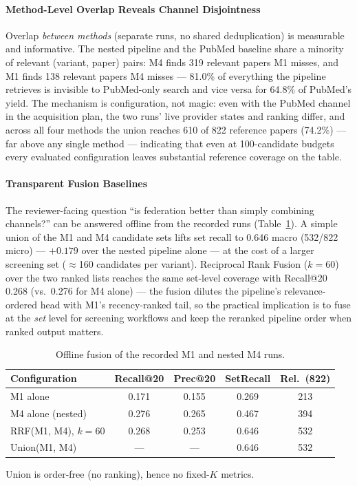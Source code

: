 \documentclass[sigconf,screen]{acmart}
\begin{document}
\paragraph{Method-Level Overlap Reveals Channel Disjointness}
Overlap \emph{between methods} (separate runs, no shared deduplication) is
measurable and informative. The nested pipeline and the PubMed baseline
share a minority of relevant (variant, paper) pairs: M4 finds 319 relevant
papers M1 misses, and M1 finds 138 relevant papers M4 misses --- 81.0\% of
everything the pipeline retrieves is invisible to PubMed-only search and
vice versa for 64.8\% of PubMed's yield. The mechanism is configuration,
not magic: even with the PubMed channel in the acquisition plan, the two
runs' live provider states and ranking differ, and across all four methods
the union reaches 610 of 822 reference papers (74.2\%) --- far above any
single method --- indicating that even at 100-candidate budgets every
evaluated configuration leaves substantial reference coverage on the
table.

\paragraph{Transparent Fusion Baselines}
The reviewer-facing question ``is federation better than simply combining
channels?'' can be answered offline from the recorded runs
(Table~\ref{tab:fusion}). A simple union of the M1 and M4 candidate sets
lifts set recall to 0.646 macro (532/822 micro) --- $+0.179$ over the
nested pipeline alone --- at the cost of a larger screening set
($\approx$160 candidates per variant). Reciprocal Rank Fusion
\cite{cormack2009reciprocal} ($k{=}60$) over the two ranked lists reaches
the same set-level coverage with Recall@20 0.268 (vs.\ 0.276 for M4
alone) --- the fusion dilutes the pipeline's relevance-ordered head with
M1's recency-ranked tail, so the practical implication is to fuse at the
\emph{set} level for screening workflows and keep the reranked pipeline
order when ranked output matters.

\begin{table}[t]
\centering
\small
\setlength{\tabcolsep}{4pt}
\begin{threeparttable}
\caption{Offline fusion of the recorded M1 and nested M4 runs.}
\label{tab:fusion}
\begin{tabular}{@{}lcccc@{}}
\toprule
Configuration & Recall@20 & Prec@20 & SetRecall & Rel.\ (822) \\
\midrule
M1 alone & 0.171 & 0.155 & 0.269 & 213 \\
M4 alone (nested) & 0.276 & 0.265 & 0.467 & 394 \\
RRF(M1, M4), $k{=}60$ & 0.268 & 0.253 & 0.646 & 532 \\
Union(M1, M4) & --- & --- & 0.646 & 532 \\
\bottomrule
\end{tabular}
\begin{tablenotes}
\item Union is order-free (no ranking), hence no fixed-$K$ metrics.
\end{tablenotes}
\end{threeparttable}
\end{table}
\end{document}
